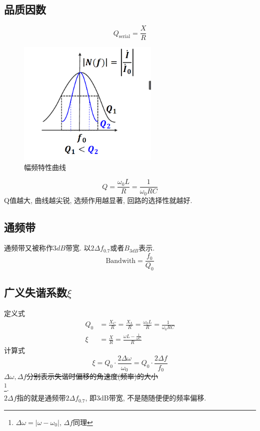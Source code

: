 \documentclass[a4paper]{report}
\begin{document}
\subsection{品质因数}
$$Q_\text{serial}=\frac{X}{R}$$
\begin{figure}[H]
  \centering
  \includegraphics[width=0.6\textwidth]{s_r_graph.png}
  \caption{幅频特性曲线}
  \end{figure}
$$Q=\frac{\omega_0 L}{R}=\frac{1}{\omega_0 R C}$$
Q值越大, 曲线越尖锐, 选频作用越显著, 回路的选择性就越好. 
\subsection{通频带}
通频带又被称作$3dB$带宽. 以$2\Delta f_{0.7}$或者$B_{3dB}$表示. 
$$\text{Bandwith}=\frac{f_0}{Q_0}$$
\subsection{广义失谐系数$\xi$}
定义式
\begin{align*}
  Q_0&=\frac{X_C}{R}=\frac{X_L}{R}=\frac{\omega_0 L}{R}=\frac{1}{\omega_0 R C}\\
  \xi&=\frac{X}{R}=\frac{\omega L-\frac{1}{\omega C}}{R}
\end{align*}
计算式
$$\xi=Q_0\cdot\frac{2\Delta\omega}{\omega_0}=Q_0\cdot\frac{2\Delta f}{f_0}$$ 
\sout{$\Delta \omega,\Delta f$分别表示失谐时偏移的角速度(频率)的大小} \\\footnote{$\Delta\omega=|\omega-\omega_0|$, $\Delta f$同理}.\\
$2\Delta f$指的就是通频带$2\Delta f_{0.7}$, 即3dB带宽, 不是随随便便的频率偏移. 
\end{document}
